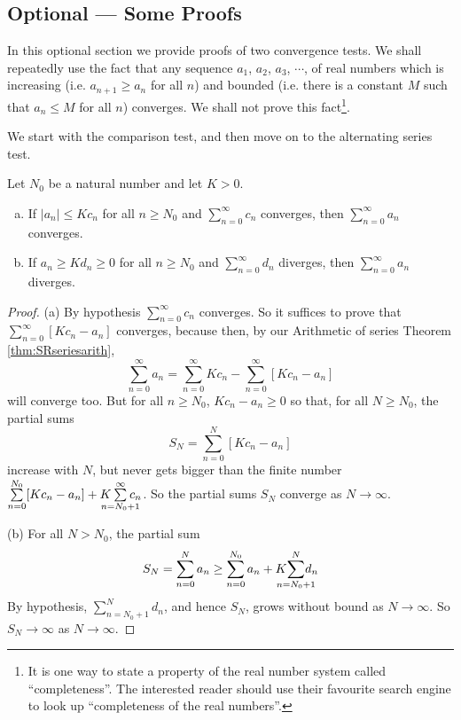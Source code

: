 \subsection{Optional --- Some Proofs}\label{sec:CompProof}

In this optional section we provide proofs of two convergence tests.
We shall repeatedly use the fact that any sequence $a_1$, $a_2$, $a_3$,
$\cdots$, of real numbers which is increasing
(i.e. $a_{n+1}\ge a_n$ for all $n$) and bounded (i.e. there is a constant $M$
such that $a_n\le M$ for all $n$) converges. We shall not prove this
fact\footnote{It is one way to state a property of the real number system
called ``completeness''. The interested reader should use their
favourite search engine to look up ``completeness of the real numbers''.}.

We start with the comparison test, and then move on to the
alternating series test.
\begingroup
\def\thetheorem{\ref{thm:SRcomparisonTest}}
\begin{theorem}
Let $N_0$ be a natural number and let $K>0$.
\begin{enumerate}[(a)]
\item If $|a_n|\le K c_n$ for all $n\ge N_0$ and
$\sum\limits_{n=0}^\infty c_n$ converges, then
$\sum\limits_{n=0}^\infty a_n$ converges.
\item If $a_n\ge K d_n\ge0 $ for all $n\ge N_0$ and
$\sum\limits_{n=0}^\infty d_n$ diverges, then
$\sum\limits_{n=0}^\infty a_n$ diverges.
\end{enumerate}
\end{theorem}
\addtocounter{theorem}{-1}
\endgroup

\begin{proof}
(a) By hypothesis $\sum_{n=0}^\infty c_n$ converges.
So it suffices to prove that $\sum_{n=0}^\infty [Kc_n-a_n]$
converges, because then, by our Arithmetic of series
Theorem \ref{thm:SRseriesarith},
\begin{equation*}
\sum_{n=0}^\infty a_n
    = \sum_{n=0}^\infty K c_n
    -\sum_{n=0}^\infty [Kc_n-a_n]
\end{equation*}
will converge too. But for all $n\ge N_0$, $Kc_n-a_n\ge 0$ so that,
for all $N\ge N_0$, the partial sums
\begin{equation*}
S_N = \sum_{n=0}^N [Kc_n-a_n]
\end{equation*}
increase with $N$, but never gets bigger than the finite number
$\sum\limits_{n=0}^{N_0} [Kc_n-a_n]
+ K\hskip-10pt\sum\limits_{n=N_0+1}^\infty\hskip-10pt c_n$.
So the partial sums $S_N$ converge as $N\rightarrow\infty$.

\medskip
\noindent (b) For all $N> N_0$, the partial sum
\begin{equation*}
S_N = \sum_{n=0}^N a_n
    \ge \sum_{n=0}^{N_0} a_n + K\hskip-10pt\sum_{n=N_0+1}^N\hskip-10pt d_n
\end{equation*}
By hypothesis, $\sum_{n=N_0+1}^N d_n$, and hence $S_N$, grows without bound as
$N\rightarrow\infty$. So $S_N\rightarrow\infty$  as $N\rightarrow\infty$.
\end{proof}

